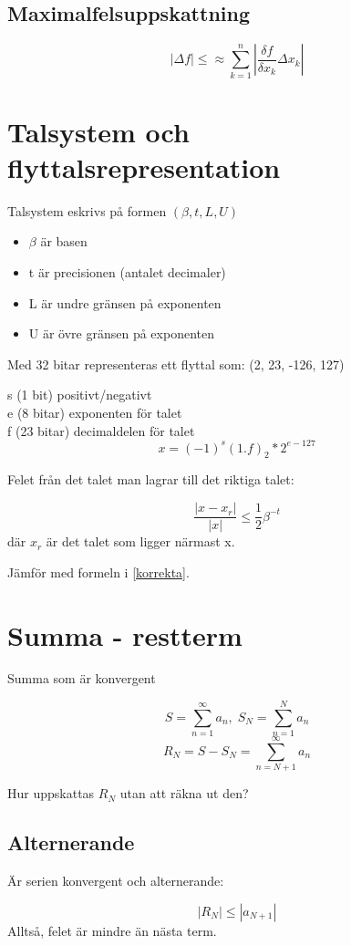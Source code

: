\documentclass[12pt,a4paper]{article}
\begin{document}
\subsection{Maximalfelsuppskattning}

$$ | \Delta f| \leq \approx \sum_{k=1}^{n} | \frac{\delta f}{\delta x_k} \Delta x_k| $$


\section{Talsystem och flyttalsrepresentation}
Talsystem eskrivs på formen $(\beta, t, L, U)$
\begin{itemize}
	\item{$\beta$ är basen}
	\item{t är precisionen (antalet decimaler)}
	\item{L är undre gränsen på exponenten}
	\item{U är övre gränsen på exponenten}
\end{itemize}

Med 32 bitar representeras ett flyttal som:
(2, 23, -126, 127)

s (1 bit) positivt/negativt \\
e (8 bitar) exponenten för talet \\
f (23 bitar) decimaldelen för talet \\
\Large
$$ x = (-1)^s(1.f)_2*2^{e-127} $$
\large

Felet från det talet man lagrar till det riktiga talet:

\Large
$$ \frac{|x-x_r|}{|x|} \leq \frac{1}{2}\beta^{-t}$$
\large
där $x_r$ är det talet som ligger närmast x.

Jämför med formeln i \ref{korrekta}.

\section{Summa - restterm}
Summa som är konvergent

$$ S = \sum_{n=1}^{\infty} a_n, \;
 S_N = \sum_{n=1}^{N} a_n$$
$$ R_N = S - S_N = \sum_{n=N+1}^{\infty} a_n $$

Hur uppskattas $R_N$ utan att räkna ut den?

\subsection{Alternerande}
Är serien konvergent och alternerande:

$$ |R_N| \leq |a_{N+1}|$$
Alltså, felet är mindre än nästa term.
\end{document}

